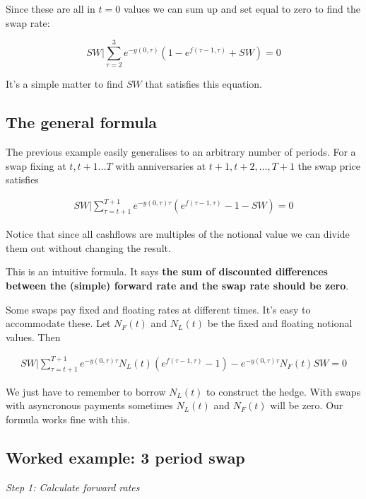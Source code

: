 \documentclass{tran-l}
\theoremstyle{definition}
\theoremstyle{remark}
\numberwithin{equation}{subsection}
\begin{document}
Since these are all in $t=0$ values we can sum up and set equal to zero to find the swap rate:

\[SW | \sum_{\tau=2}^3  e^{-y(0,\tau)}(1-e^{f(\tau-1,\tau)} +SW) = 0 \]

It's a simple matter to find $SW$ that satisfies this equation.

\subsection{The general formula}

The previous example easily generalises to an arbitrary number of periods. For a swap fixing at $t, t+1 \ldots T$ with anniversaries at $t+1,t+2,\ldots,T+1$ the swap price satisfies

\begin{eqnarray}
SW  | \sum_{\tau=t+1}^{T+1}  e^{-y(0,\tau)\tau}(e^{f(\tau-1,\tau)}-1 -SW) = 0  \label{swapprice}
\end{eqnarray}

Notice that since all cashflows are multiples of the notional value we can divide them out  without changing the result. 

This is an intuitive formula. It says \textbf{the sum of discounted differences between the (simple) forward rate and the swap rate should be zero}.

Some swaps pay fixed and floating rates at different times. It's easy to accommodate these. Let $N_F(t)$ and $N_L(t)$ be the fixed and floating notional values. Then 

\begin{eqnarray*}
SW  | \sum_{\tau=t+1}^{T+1}  e^{-y(0,\tau)\tau}N_L(t)(e^{f(\tau-1,\tau)}-1)  - e^{-y(0,\tau)\tau}N_F(t)SW = 0  \label{swapgeneral}
\end{eqnarray*}

We just have to remember to borrow $N_L(t)$ to construct the hedge. With swaps with asyncronous payments sometimes $N_L(t)$ and $N_F(t)$ will be zero. Our formula works fine with this.


\subsection{Worked example: 3 period swap}

\textit{Step 1: Calculate forward rates}\\
\end{document}
